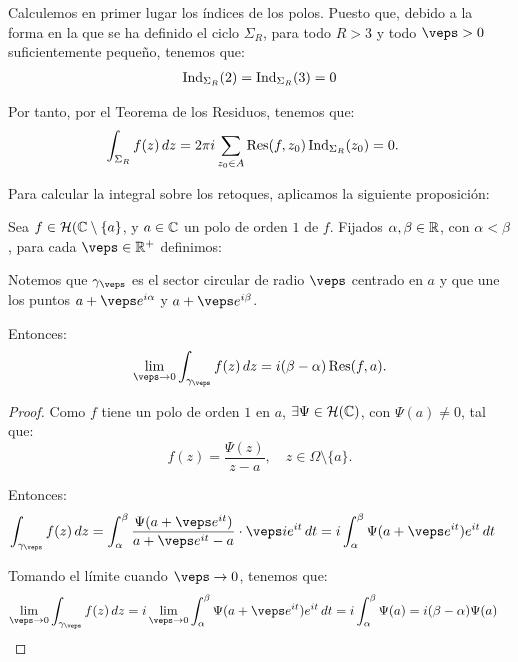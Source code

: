 \begin{ejercicio}
    Calculemos en primer lugar los índices de los polos. Puesto que, debido a la forma en la que se ha definido el ciclo $\Sigma_R$, para todo $R > 3$ y todo $\veps > 0$ suficientemente pequeño, tenemos que:
    \begin{align*}
        \operatorname{Ind}_{\Sigma_R}(2) = \operatorname{Ind}_{\Sigma_R}(3) = 0
    \end{align*}

    Por tanto, por el Teorema de los Residuos, tenemos que:
    \begin{align*}
        \int_{\Sigma_R} f(z) \, dz &= 2\pi i\sum_{z_0\in A}\operatorname{Res}(f,z_0)\operatorname{Ind}_{\Sigma_R}(z_0) = 0.
    \end{align*}

    Para calcular la integral sobre los retoques, aplicamos la siguiente proposición:
    \begin{prop}
        Sea $f\in \mathcal{H}(\mathbb{C}\setminus \{a\}$, y $a\in \mathbb{C}$ un polo de orden $1$ de $f$. Fijados $\alpha,\beta\in \mathbb{R}$, con $\alpha < \beta$, para cada $\veps\in \bb{R}^+$ definimos:

        Notemos que $\gamma_\veps$ es el sector circular de radio $\veps$ centrado en $a$ y que une los puntos $a + \veps e^{i\alpha}$ y $a + \veps e^{i\beta}$.

        Entonces:
        \begin{equation*}
            \lim_{\veps\to 0} \int_{\gamma_\veps} f(z) \, dz = i(\beta-\alpha)\Res(f,a).
        \end{equation*}
        \begin{proof}
            Como $f$ tiene un polo de orden $1$ en $a$, $\exists \Psi\in \mathcal{H}(\mathbb{C})$, con $\Psi(a) \neq 0$, tal que:
            \begin{equation*}
                f(z) = \frac{\Psi(z)}{z-a}, \quad z\in \Omega\setminus \{a\}.
            \end{equation*}

            Entonces:
            \begin{align*}
                \int_{\gamma_\veps} f(z) \, dz &= \int_{\alpha}^{\beta} \frac{\Psi(a + \veps e^{it})}{a+\veps e^{it} - a} \cdot \veps i e^{it} \, dt
                = i\int_{\alpha}^{\beta} \Psi(a + \veps e^{it}) e^{it} \, dt
            \end{align*}

            Tomando el límite cuando $\veps\to 0$, tenemos que:
            \begin{align*}
                \lim_{\veps\to 0} \int_{\gamma_\veps} f(z) \, dz &= i\lim_{\veps\to 0} \int_{\alpha}^{\beta} \Psi(a + \veps e^{it}) e^{it} \, dt
                = i\int_{\alpha}^{\beta} \Psi(a) = i(\beta - \alpha)\Psi(a)
            \end{align*}


\end{proof}
\end{prop}
\end{ejercicio}
